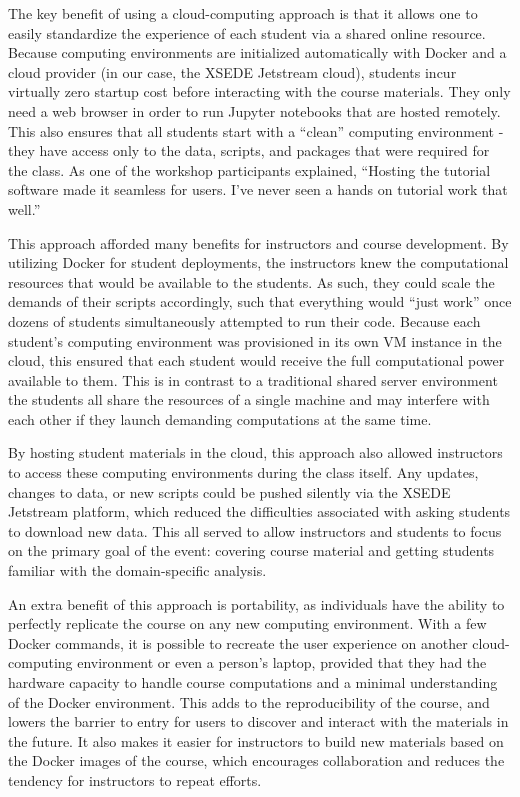 The key benefit of using a cloud-computing approach is that it allows one to
easily standardize the experience of each student via a shared online
resource. Because computing environments are initialized automatically with
Docker and a cloud provider (in our case, the XSEDE Jetstream cloud),
students incur virtually zero startup cost
before interacting with the course materials. They only need a web browser in
order to run Jupyter notebooks that are hosted remotely.
This also ensures that all students
start with a ``clean'' computing environment - they have access only to the data,
scripts, and packages that were required for the class. As one of the workshop
participants explained, ``Hosting
the tutorial software made it seamless for users. I've never seen a hands on
tutorial work that well.''

This approach afforded many benefits for instructors and course development.
By utilizing Docker for student deployments, the instructors knew the
computational resources that would be available to the students. As such, they
could scale the demands of their scripts accordingly, such that everything would
``just work'' once dozens of students simultaneously attempted to run their
code. Because each student's computing environment was provisioned in its own VM
instance in the cloud, this ensured that each student would receive the full
computational power available to them. This is in contrast to a traditional shared server
environment the students all share the resources of a single machine and may
interfere with each other if they launch demanding computations at the same
time.

By hosting student materials in the cloud, this approach also allowed instructors
to access these computing environments during the class itself. Any updates,
changes to data, or new scripts could be pushed silently via the XSEDE Jetstream
platform, which reduced the difficulties associated with asking students to
download new data. This all served to allow instructors and students to focus on
the primary goal of the event: covering course material and getting students
familiar with the domain-specific analysis.

An extra benefit of this approach is portability, as individuals have the
ability to perfectly replicate the course on any new computing environment. With
a few Docker commands, it is possible to recreate the user experience on another
cloud-computing environment or even a person's laptop, provided that they had
the hardware capacity to handle course computations and a minimal understanding
of the Docker environment. This adds to the reproducibility of the course, and
lowers the barrier to entry for users to discover and interact with the
materials in the future. It also makes it easier for instructors to build new
materials based on the Docker images of the course, which encourages
collaboration and reduces the tendency for instructors to repeat efforts.

